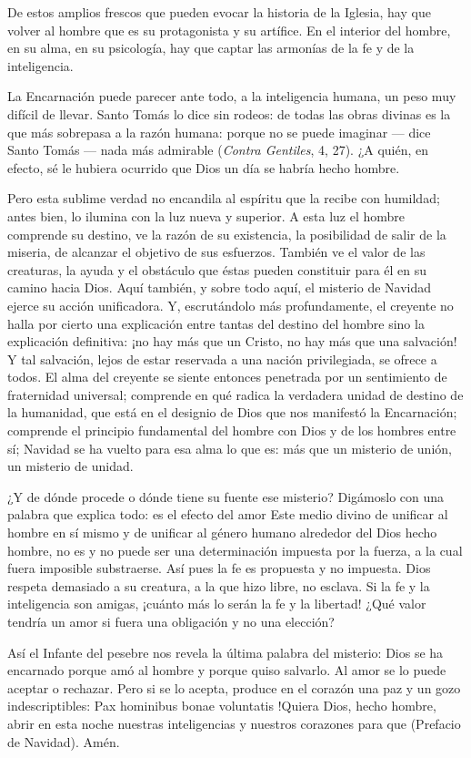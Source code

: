 \begin{body}
	De estos amplios frescos que pueden evocar la historia de la Iglesia, hay que volver al hombre que es su protagonista y su artífice. En el interior del hombre, en su alma, en su psicología, hay que captar las armonías de la fe y de la inteligencia.
	
	La Encarnación puede parecer ante todo, a la inteligencia humana, un peso muy difícil de llevar. Santo Tomás lo dice sin rodeos: de todas las obras divinas es la que más sobrepasa a la razón humana: porque no se puede imaginar --- dice Santo Tomás --- nada más admirable (\emph{Contra Gentiles}, 4, 27). ¿A quién, en efecto, sé le hubiera ocurrido que Dios un día se habría hecho hombre.
	
	Pero esta sublime verdad no encandila al espíritu que la recibe con humildad; antes bien, lo ilumina con la luz nueva y superior. A esta luz el hombre comprende su destino, ve la razón de su existencia, la posibilidad de salir de la miseria, de alcanzar el objetivo de sus esfuerzos. También ve el valor de las creaturas, la ayuda y el obstáculo que éstas pueden constituir para él en su camino hacia Dios. Aquí también, y sobre todo aquí, el misterio de Navidad ejerce su acción unificadora. Y, escrutándolo más profundamente, el creyente no halla por cierto una explicación entre tantas del destino del hombre sino la explicación definitiva: ¡no hay más que un Cristo, no hay más que una salvación! Y tal salvación, lejos de estar reservada a una nación privilegiada, se ofrece a todos. El alma del creyente se siente entonces penetrada por un sentimiento de fraternidad universal; comprende en qué radica la verdadera unidad de destino de la humanidad, que está en el designio de Dios que nos manifestó la Encarnación; comprende el principio fundamental del hombre con Dios y de los hombres entre sí; Navidad se ha vuelto para esa alma lo que es: más que un misterio de unión, un misterio de unidad.
	
	¿Y de dónde procede o dónde tiene su fuente ese misterio? Digámoslo con una palabra que explica todo: es el efecto del amor Este medio divino de unificar al hombre en sí mismo y de unificar al género humano alrededor del Dios hecho hombre, no es y no puede ser una determinación impuesta por la fuerza, a la cual fuera imposible substraerse. Así pues la fe es propuesta y no impuesta. Dios respeta demasiado a su creatura, a la que hizo libre, no esclava. Si la fe y la inteligencia son amigas, ¡cuánto más lo serán la fe y la libertad! ¿Qué valor tendría un amor si fuera una obligación y no una elección?
	
	Así el Infante del pesebre nos revela la última palabra del misterio: Dios se ha encarnado porque amó al hombre y porque quiso salvarlo. Al amor se lo puede aceptar o rechazar. Pero si se lo acepta, produce en el corazón una paz y un gozo indescriptibles: Pax hominibus bonae voluntatis !Quiera Dios, hecho hombre, abrir en esta noche nuestras inteligencias y nuestros corazones para que  (Prefacio de Navidad). Amén.
\end{body}

